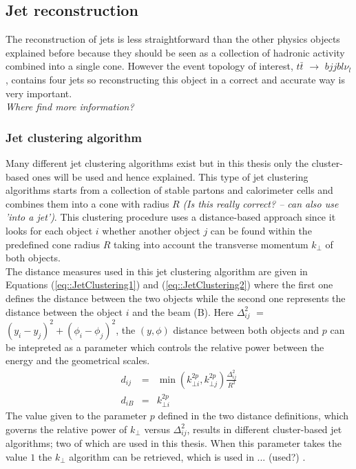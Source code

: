 \subsection{Jet reconstruction}
The reconstruction of jets is less straightforward than the other physics objects explained before because they should be seen as a collection of hadronic activity combined into a single cone. However the event topology of interest, $t\bar{t}$ $\rightarrow$ $bjjbl\nu_{l}$, contains four jets so reconstructing this object in a correct and accurate way is very important.
\\
\textit{Where find more information?}
 
\subsubsection*{Jet clustering algorithm}
Many different jet clustering algorithms exist but in this thesis only the cluster-based ones will be used and hence explained. This type of jet clustering algorithms starts from a collection of stable partons and calorimeter cells and combines them into a cone with radius $R$ \textit{(Is this really correct? --  can also use 'into a jet')}. This clustering procedure uses a distance-based approach since it looks for each object $i$ whether another object $j$ can be found within the predefined cone radius $R$ taking into account the transverse momentum $k_{\bot}$ of both objects.
\\
The distance measures used in this jet clustering algorithm are given in Equations (\ref{eq::JetClustering1}) and (\ref{eq::JetClustering2}) where the first one defines the distance between the two objects while the second one represents the distance between the object $i$ and the beam (B). Here $\Delta_{ij}^{2}$ $=$ $(y_i - y_j)^{2} + (\phi_i - \phi_j)^2$, the $(y,\phi)$ distance between both objects and $p$ can be intepreted as a parameter which controls the relative power between the energy and the geometrical scales.
\\
\begin{eqnarray}
 d_{ij} & = & \min(k_{\bot i}^{2p}, k_{\bot j}^{2p}) \frac{\Delta_{ij}^{2}}{R^{2}} \label{eq::JetClustering1} \\
 d_{iB} & = & k_{\bot i}^{2p}                                                      \label{eq::JetClustering2}
\end{eqnarray}
The value given to the parameter $p$ defined in the two distance definitions, which governs the relative power of $k_{\bot}$ versus $\Delta_{ij}^{2}$, results in different cluster-based jet algorithms; two of which are used in this thesis. When this parameter takes the value $1$ the $k_{\bot}$ algorithm can be retrieved, which is used in ... (used?) . 
